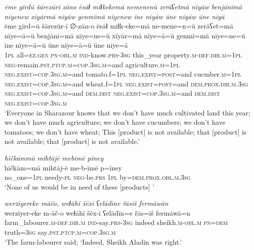 \ea \label{PM.37}
\textit{ēme girdū šārezūrī zāno ēsāɫ miɫkekemā nemenenū zerāʕetmā nīyāw benjānīmā nīyenew xīyārmā nīyāw genmīmā nīyenew īne nīyāw ūne nīyāw ūne nīyā} \\ 
\gll ēme gird=ū šārezūr-ī ∅-zān-o ēsāɫ miɫk-eke=mā ne-mene=n=ū zerāʕet=mā nīye=ā=ū benjānī=mā nīye=ne=ū xīyār=mā nīye=ā=ū genmī=mā nīye=ne=ū īne nīye=ā=ū ūne nīye=ā=ū ūne nīye=ā \\ 
 \textsc{1pl} all\textsc{\textsc{=ez.gen}} \textsc{pn}\textsc{-obl}\textsc{.m} \textsc{ind-}know\textsc{.prs}\textsc{-3sg} this\_year property\textsc{.m}\textsc{-def}\textsc{.dir}\textsc{.m}\textsc{=1pl} \textsc{neg-}remain\textsc{.pst}\textsc{.ptcp}\textsc{.m}\textsc{=cop}\textsc{.3sg}\textsc{.m}=and agriculture\textsc{.m}\textsc{=1pl} \textsc{\textsc{neg.}exist}\textsc{=cop}\textsc{.3sg}\textsc{.m}=and tomato.f\textsc{=1pl} \textsc{\textsc{neg.}exist}\textsc{=\textsc{post}}=and cucmber\textsc{.m}\textsc{=1pl} \textsc{\textsc{neg.}exist}\textsc{=cop}\textsc{.3sg}\textsc{.m}=and wheat.f\textsc{=1pl} \textsc{\textsc{neg.}exist}\textsc{=\textsc{post}}=and \textsc{dem.prox}\textsc{.dir}\textsc{.m}\textsc{.3sg} \textsc{\textsc{neg.}exist}\textsc{=cop}\textsc{.3sg}\textsc{.m}=and \textsc{dem.dist} \textsc{\textsc{neg.}exist}\textsc{=cop}\textsc{.3sg}\textsc{.m}=and \textsc{dem.dist} \textsc{\textsc{neg.}exist}\textsc{=cop}\textsc{.3sg}\textsc{.m} \\ 
\glt `Everyone in Sharazour knows that we don’t have much cultivated land this year; we don’t have much agriculture; we don’t have cucumbers; we don’t have tomatoes; we don’t have wheat; This [product] is not available; that [product] is not available; that [product] is not available.'
\z 
 
\ea \label{PM.39}
\textit{hīčkāmmā mihtājē mebīmē pīney} \\ 
\gll hīčkām=mā mihtāj-ē me-b-īmē p=īney \\ 
 no\_one\textsc{=1pl} needy\textsc{\textsc{-pl}} \textsc{neg-}be\textsc{.prs} \textsc{1pl} by=\textsc{dem.prox}\textsc{.obl}\textsc{.m}\textsc{.3sg} \\ 
\glt `None of us would be in need of these [products] '
\z 
 
\ea \label{PM.44}
\textit{werzīyereke māčo, weɫāhī šēxī ʕelādīne řāsiš fermāwān} \\ 
\gll werzīyer-eke m-āč-o weɫāhī šēx-ī ʕelādīn=e řās=iš fermāwā=n \\ 
 farm\_labourer\textsc{.m}\textsc{-def}\textsc{.dir}\textsc{.m} \textsc{ind-}say\textsc{.prs}\textsc{-3sg} indeed sheikh\textsc{.m}\textsc{-obl}\textsc{.m} \textsc{pn}\textsc{=dem} truth\textsc{=3sg} say\textsc{.pst}\textsc{.ptcp}\textsc{.m}\textsc{=cop}\textsc{.3sg}\textsc{.m} \\ 
\glt `The farm-labourer said; ‘Indeed, Sheikh Aladin was right.'
\z 
 
